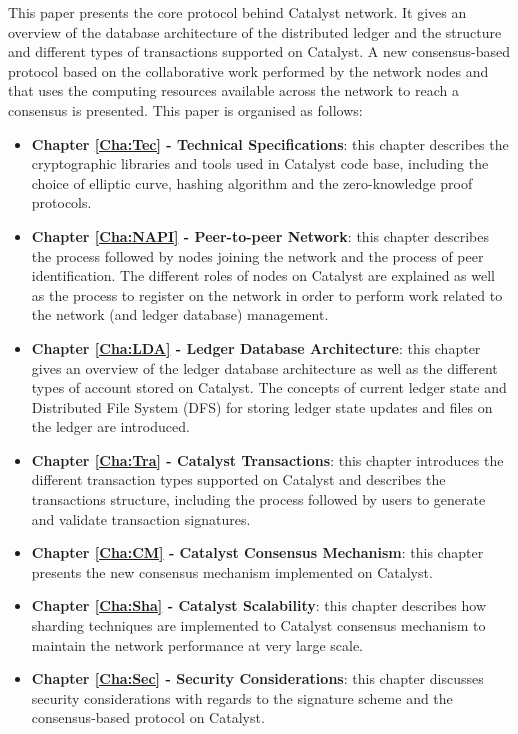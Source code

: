This paper presents the core protocol behind Catalyst network. It gives an overview of the database architecture of the distributed ledger and the structure and different types of transactions supported on Catalyst. A new consensus-based protocol based on the collaborative work performed by the network nodes and that uses the computing resources available across the network to reach a consensus is presented. This paper is organised as follows:

\begin{itemize}
\item \textbf{Chapter \ref{Cha:Tec} - Technical Specifications}: this chapter describes the cryptographic libraries and tools used in Catalyst code base, including the choice of elliptic curve, hashing algorithm and the zero-knowledge proof protocols. 

\item \textbf{Chapter \ref{Cha:NAPI} - Peer-to-peer Network}: this chapter describes the process followed by nodes joining the network and the process of peer identification. The different roles of nodes on Catalyst are explained as well as the process to register on the network in order to perform work related to the network (and ledger database) management. 

\item \textbf{Chapter \ref{Cha:LDA} - Ledger Database Architecture}: this chapter gives an overview of the ledger database architecture as well as the different types of account stored on Catalyst. The concepts of current ledger state and Distributed File System (DFS) for storing ledger state updates and files on the ledger are introduced. 

\item \textbf{Chapter \ref{Cha:Tra} - Catalyst Transactions}: this chapter introduces the different transaction types supported on Catalyst and describes the transactions structure, including the process followed by users to generate and validate transaction signatures. 

\item \textbf{Chapter \ref{Cha:CM} - Catalyst Consensus Mechanism}: this chapter presents the new consensus mechanism implemented on Catalyst. 

\item \textbf{Chapter \ref{Cha:Sha} - Catalyst Scalability}: this chapter describes how sharding techniques are implemented to Catalyst consensus mechanism to maintain the network performance at very large scale. 


\item \textbf{Chapter \ref{Cha:Sec} - Security Considerations}: this chapter discusses security considerations with regards to the signature scheme and the consensus-based protocol on Catalyst. 

\end{itemize}